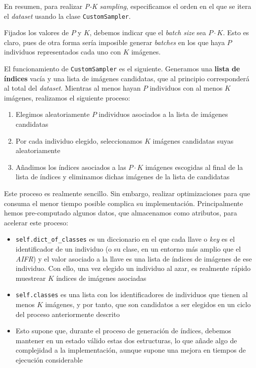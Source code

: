En resumen, para realizar \textit{P-K sampling}, especificamos el orden en el que se itera el \textit{dataset} usando la clase \lstinline{CustomSampler}.

Fijados los valores de $P$ y $K$, debemos indicar que el \textit{batch size} sea $P \cdot K$. Esto es claro, pues de otra forma sería imposible generar \textit{batches} en los que haya $P$ individuos representados cada uno con $K$ imágenes.

El funcionamiento de \lstinline{CustomSampler} es el siguiente. Generamos una \textbf{lista de índices} vacía y una lista de imágenes candidatas, que al principio corresponderá al total del \textit{dataset}. Mientras al menos hayan $P$ individuos con al menos $K$ imágenes, realizamos el siguiente proceso:

\begin{enumerate}
    \item Elegimos aleatoriamente $P$ individuos asociados a la lista de imágenes candidatas
    \item Por cada individuo elegido, seleccionamos $K$ imágenes candidatas suyas aleatoriamente
    \item Añadimos los índices asociados a las $P \cdot K$ imágenes escogidas al final de la lista de índices y eliminamos dichas imágenes de la lista de candidatas
\end{enumerate}

Este proceso es realmente sencillo. Sin embargo, realizar optimizaciones para que consuma el menor tiempo posible complica su implementación. Principalmente hemos pre-computado algunos datos, que almacenamos como atributos, para acelerar este proceso:

\begin{itemize}
    \item \lstinline{self.dict_of_classes} es un diccionario en el que cada llave o \textit{key} es el identificador de un individuo (o su clase, en un entorno más amplio que el \textit{AIFR}) y el valor asociado a la llave es una lista de índices de imágenes de ese individuo. Con ello, una vez elegido un individuo al azar, es realmente rápido muestrear $K$ índices de imágenes asociadas
    \item \lstinline{self.classes} es una lista con los identificadores de individuos que tienen al menos $K$ imágenes, y por tanto, que son candidatos a ser elegidos en un ciclo del proceso anteriormente descrito
    \item Esto supone que, durante el proceso de generación de índices, debemos mantener en un estado válido estas dos estructuras, lo que añade algo de complejidad a la implementación, aunque supone una mejora en tiempos de ejecución considerable
\end{itemize}

